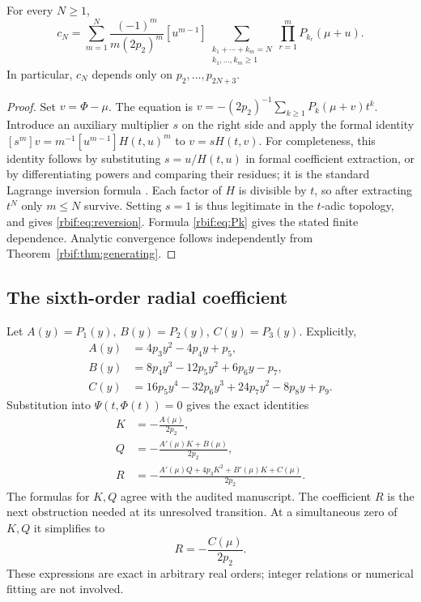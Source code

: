 \begin{proposition}
\label{rbif:prop:reversion}
For every $N\ge1$,
\begin{equation}
 c_N=\sum_{m=1}^N\frac{(-1)^m}{m(2p_2)^m}
 [u^{m-1}]\!
 \sum_{\substack{k_1+\cdots+k_m=N\\k_1,\ldots,k_m\ge1}}
       \prod_{r=1}^m P_{k_r}(\mu+u).
 \label{rbif:eq:reversion}
\end{equation}
In particular, $c_N$ depends only on $p_2,\ldots,p_{2N+3}$.
\end{proposition}
\begin{proof}
Set $v=\Phi-\mu$. The equation is
$v=-(2p_2)^{-1}\sum_{k\ge1}P_k(\mu+v)t^k$.
Introduce an auxiliary multiplier $s$ on the right side and apply the
formal identity
$[s^m]v=m^{-1}[u^{m-1}]H(t,u)^m$ to $v=sH(t,v)$.
For completeness, this identity follows by substituting
$s=u/H(t,u)$ in formal coefficient extraction, or by differentiating
powers and comparing their residues; it is the standard Lagrange
inversion formula \cite{rbif:gessel}. Each factor of $H$ is divisible
by $t$, so after extracting $t^N$ only $m\le N$ survive. Setting $s=1$
is thus legitimate in the $t$-adic topology, and gives
\eqref{rbif:eq:reversion}. Formula \eqref{rbif:eq:Pk} gives the stated
finite dependence. Analytic convergence follows independently from
Theorem~\ref{rbif:thm:generating}.
\end{proof}

\subsection{The sixth-order radial coefficient}
Let $A(y)=P_1(y)$, $B(y)=P_2(y)$, $C(y)=P_3(y)$. Explicitly,
\begin{align}
 A(y)&=4p_3y^2-4p_4y+p_5,\label{rbif:eq:ABC1}\\
 B(y)&=8p_4y^3-12p_5y^2+6p_6y-p_7,\\
 C(y)&=16p_5y^4-32p_6y^3+24p_7y^2-8p_8y+p_9.
 \label{rbif:eq:ABC3}
\end{align}
Substitution into $\Psi(t,\Phi(t))=0$ gives the exact identities
\begin{align}
 K&=-\frac{A(\mu)}{2p_2},\label{rbif:eq:K}\\
 Q&=-\frac{A'(\mu)K+B(\mu)}{2p_2},\label{rbif:eq:Q}\\
 R&=-\frac{A'(\mu)Q+4p_3K^2+B'(\mu)K+C(\mu)}{2p_2}.
 \label{rbif:eq:R}
\end{align}
The formulas for $K,Q$ agree with the audited manuscript. The coefficient
$R$ is the next obstruction needed at its unresolved transition.
At a simultaneous zero of $K,Q$ it simplifies to
\begin{equation}
 R=-\frac{C(\mu)}{2p_2}.
 \label{rbif:eq:Rdeg}
\end{equation}
These expressions are exact in arbitrary real orders; integer relations
or numerical fitting are not involved.


